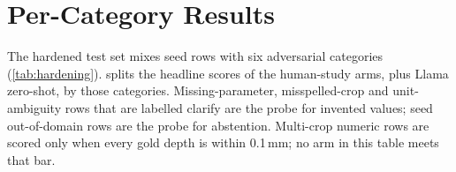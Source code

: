 \chapter{Per-Category Results}
\label{app:C}
\label{app:percategory}

The hardened test set mixes seed rows with six adversarial categories (\cref{tab:hardening}).  splits the headline scores of the human-study arms, plus Llama zero-shot, by those categories. Missing-parameter, misspelled-crop and unit-ambiguity rows that are labelled clarify are the probe for invented values; seed out-of-domain rows are the probe for abstention. Multi-crop numeric rows are scored only when every gold depth is within 0.1\,mm; no arm in this table meets that bar.


